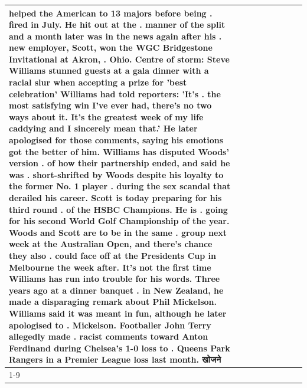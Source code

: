 \begin{table}[H]
\begin{tabular}{lllrlllll}
helped the American to 13 majors before being . fired in July. He hit out at the . manner of the split and a month later was in the news again after his . new employer, Scott, won the WGC Bridgestone Invitational at Akron, . Ohio. Centre of storm: Steve Williams stunned guests at a gala dinner with a racial slur when accepting a prize for 'best celebration' Williams had told reporters: 'It's . the most satisfying win I've ever had, there's no two ways about it. It's the greatest week of my life caddying and I sincerely mean that.' He later apologised for those comments, saying his emotions got the better of him. Williams has disputed Woods' version . of how their partnership ended, and said he was . short-shrifted by Woods despite his loyalty to the former No. 1 player . during the sex scandal that derailed his career. Scott is today preparing for his third round . of the HSBC Champions. He is . going for his second World Golf Championship of the year. Woods and Scott are to be in the same . group next week at the Australian Open, and there's chance they also . could face off at the Presidents Cup in Melbourne the week after. It's not the first time Williams has run into trouble for his words. Three years ago at a dinner banquet . in New Zealand, he made a disparaging remark about Phil Mickelson. Williams said it was meant in fun, although he later apologised to . Mickelson. Footballer John Terry allegedly made . racist comments toward Anton Ferdinand during Chelsea's 1-0 loss to . Queens Park Rangers in a Premier League loss last month. खोजने \\
\cline{1-9}

\end{tabular}
\end{table}
